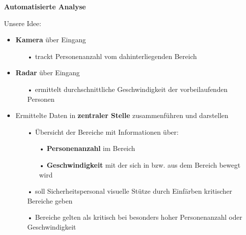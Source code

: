 \documentclass[%
textcolor=HDA_lightblue,	%
pagecolor=radacc_darkblue,		%
]{../estposter}
\begin{document}
\begin{textblock}{12.5}
\color{HDA_gray_0}
\textbf{Automatisierte Analyse }
\par\smallskip

\color{HDA_lightblue}
Unsere Idee:
\begin{itemize}[leftmargin=10pt, rightmargin=10pt, topsep=3pt,itemsep=1pt,partopsep=1pt, parsep=1pt]
	\item \textbf{Kamera} über Eingang
		
	 	\begin{itemize}
			\item[•] trackt Personenanzahl vom dahinterliegenden Bereich
		\end{itemize}
		
	\item \textbf{Radar} über Eingang
	 	\begin{itemize}
			\item[•] ermittelt durchschnittliche Geschwindigkeit der vorbeilaufenden Personen
		\end{itemize}

	\item Ermittelte Daten in \textbf{zentraler Stelle} zusammenführen und darstellen
	
		\begin{itemize}
			\item[•] Übersicht der Bereiche mit Informationen über:
			
				\begin{itemize}
					\item[•] \textbf{Personenanzahl} im Bereich
					\item[•] \textbf{Geschwindigkeit} mit der sich in bzw. aus dem Bereich bewegt wird
				\end{itemize}
				
			\item[•] soll Sicherheitspersonal visuelle Stütze durch Einfärben kritischer Bereiche geben
			\item[•] Bereiche gelten als kritisch bei besonders hoher Personenanzahl oder Geschwindigkeit
		\end{itemize}

\end{itemize}


\begin{addmargin}[0pt]{30mm}
\end{addmargin}



\end{textblock}
\end{document}
